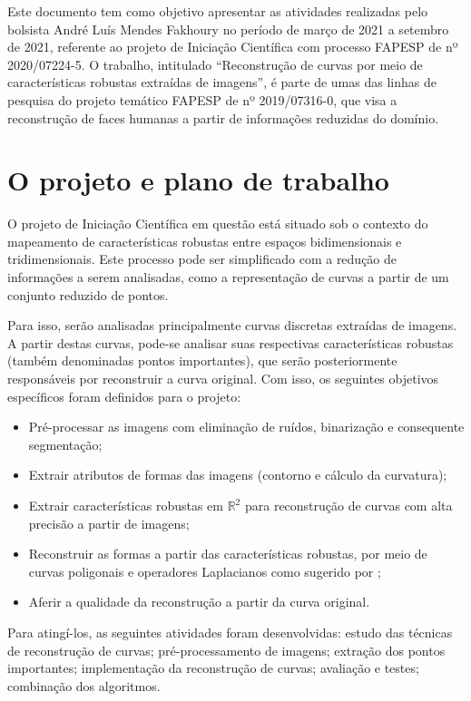 Este documento tem como objetivo apresentar as atividades realizadas pelo bolsista André Luís Mendes Fakhoury no período de março de 2021 a setembro de 2021, referente ao projeto de Iniciação Científica com processo FAPESP de nº 2020/07224-5. O trabalho, intitulado ``Reconstrução de curvas por meio de características robustas extraídas de imagens'', é parte de umas das linhas de pesquisa do projeto temático FAPESP de nº 2019/07316-0, que visa a reconstrução de faces humanas a partir de informações reduzidas do domínio.

\section{O projeto e plano de trabalho}

O projeto de Iniciação Científica em questão está situado sob o contexto do mapeamento de características robustas entre espaços bidimensionais e tridimensionais. Este processo pode ser simplificado com a redução de informações a serem analisadas, como a representação de curvas a partir de um conjunto reduzido de pontos.

Para isso, serão analisadas principalmente curvas discretas extraídas de imagens. A partir destas curvas, pode-se analisar suas respectivas características robustas (também denominadas pontos importantes), que serão posteriormente responsáveis por reconstruir a curva original. Com isso, os seguintes objetivos específicos foram definidos para o projeto:

\begin{itemize}[noitemsep]
	\item Pré-processar as imagens com eliminação de ruídos, binarização e consequente segmentação;
	\item Extrair atributos de formas das imagens (contorno e cálculo da curvatura);
	\item Extrair características robustas em $\mathbb{R}^2$ para reconstrução de curvas com alta precisão a partir de imagens;
	\item Reconstruir as formas a partir das características robustas, por meio de curvas poligonais e operadores Laplacianos como sugerido por ;
	\item Aferir a qualidade da reconstrução a partir da curva original.
\end{itemize}

Para atingí-los, as seguintes atividades foram desenvolvidas: estudo das técnicas de reconstrução de curvas; pré-processamento de imagens; extração dos pontos importantes; implementação da reconstrução de curvas; avaliação e testes; combinação dos algoritmos.

